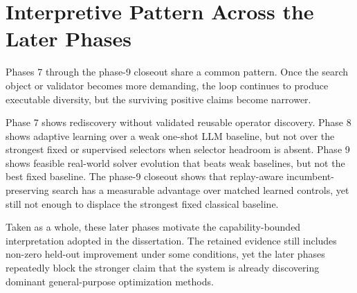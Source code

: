 \section{Interpretive Pattern Across the Later Phases}
\label{sec:advanced-interpretation}

Phases 7 through the phase-9 closeout share a common pattern. Once the search object or validator
becomes more demanding, the loop continues to produce executable diversity, but the surviving
positive claims become narrower.

Phase 7 shows rediscovery without validated reusable operator discovery. Phase 8 shows adaptive
learning over a weak one-shot LLM baseline, but not over the strongest fixed or supervised
selectors when selector headroom is absent. Phase 9 shows feasible real-world solver evolution
that beats weak baselines, but not the best fixed baseline. The phase-9 closeout shows that
replay-aware incumbent-preserving search has a measurable advantage over matched learned controls,
yet still not enough to displace the strongest fixed classical baseline.

Taken as a whole, these later phases motivate the capability-bounded interpretation adopted in the
dissertation. The retained evidence still includes non-zero held-out improvement under some
conditions, yet the later phases repeatedly block the stronger claim that the system is already
discovering dominant general-purpose optimization methods.
